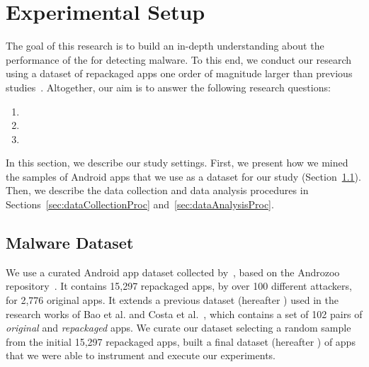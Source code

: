 \section{Experimental Setup}\label{sec:experimentalSetup}

The goal of this research is to build an in-depth understanding about
the performance of the \mas for detecting malware. To this
end, we conduct our research using a dataset of repackaged apps one order of magnitude
larger than previous studies~\cite{DBLP:conf/wcre/BaoLL18,DBLP:journals/jss/CostaMMSSBNR22}. Altogether, our
aim is to answer the following research questions:

\begin{enumerate}[(RQ1)]
\item \rqa
\item \rqc
\item \rqd  
\end{enumerate}

In this section, we describe our study settings. First, we present how we mined the samples of Android apps that we
use as a dataset for our study (Section~\ref{sec:dataset}).  Then, we describe the data
collection and data analysis procedures in Sections~\ref{sec:dataCollectionProc} and~\ref{sec:dataAnalysisProc}.


\subsection{Malware Dataset}\label{sec:dataset}

We use a curated Android app dataset collected by~\cite{DBLP:journals/tse/LiBK21}, based on the Androzoo repository~\cite{DBLP:conf/msr/AllixBKT16}. It contains 15,297 repackaged apps, by over 100 different attackers, for
2,776 original apps. It extends a previous dataset (hereafter \sds) used in the research works of Bao et al. and Costa et al.~\cite{DBLP:conf/wcre/BaoLL18,DBLP:conf/scam/CostaMCMVBC20}, which contains a set of 102 pairs of \emph{original} and \emph{repackaged} apps. We curate our dataset selecting a random sample from the initial 15,297 repackaged apps, built a final dataset (hereafter \cds) of \apps apps that we were able to instrument and execute our experiments.



